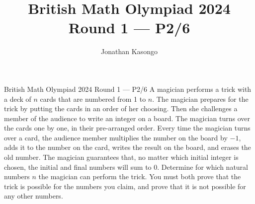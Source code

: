 \documentclass{article}
\author{Jonathan Kasongo}
\title{British Math Olympiad 2024 Round 1 --- P2/6}
\begin{document}
\maketitle

\begin{problem}{British Math Olympiad 2024 Round 1 --- P2/6}
A magician performs a trick with a deck of $n$ cards that are numbered from 1 to $n$. The
magician prepares for the trick by putting the cards in an order of her choosing. Then she
challenges a member of the audience to write an integer on a board. The magician turns over
the cards one by one, in their pre-arranged order. Every time the magician turns over a card,
the audience member multiplies the number on the board by $-1$, adds it to the number on
the card, writes the result on the board, and erases the old number. The magician guarantees
that, no matter which initial integer is chosen, the initial and final numbers will sum to 0.
Determine for which natural numbers $n$ the magician can perform the trick. You must both
prove that the trick is possible for the numbers you claim, and prove that it is not possible
for any other numbers.
\end{problem}
\end{document}
